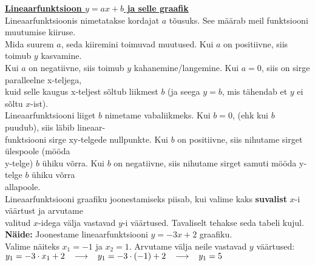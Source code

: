 \begin{center}
{{{\begin{flushleft}
\hspace{5mm}
\textbf{\underline{Lineaarfunktsioon $y=ax+b$ ja selle graafik}}\\
\vspace{5mm}
\hspace{5mm}
Lineaarfunktsioonis nimetatakse kordajat $a$ tõusuks. See määrab meil funktsiooni muutumise kiiruse.\\ \hspace{5mm} Mida suurem $a$, seda kiiremini toimuvad muutused. Kui $a$ on positiivne, siis toimub $y$ kasvamine. \\ \hspace{5mm} Kui $a$ on negatiivne, siis toimub $y$  kahanemine/langemine. Kui $a=0$, siis on sirge paralleelne x-teljega,\\ \hspace{5mm} kuid selle kaugus x-teljest sõltub liikmest $b$ (ja seega $y=b$, mis tähendab et $y$ ei sõltu $x$-ist).\\
\vspace{2mm}
\hspace{5mm}
Lineaarfunktsiooni liiget $b$ nimetame vabaliikmeks. Kui $b=0$, (ehk kui $b$ puudub), siis läbib lineaar-\\ \hspace{5mm} funktsiooni sirge xy-telgede nullpunkte. Kui $b$ on positiivne, siis nihutame sirget ülespoole (mööda\\ \hspace{5mm} y-telge) $b$ ühiku võrra. Kui $b$ on negatiivne, siis nihutame sirget samuti mööda y-telge $b$ ühiku võrra\\ \hspace{5mm} allapoole.\\
\hspace{5mm} Lineaarfunktsiooni graafiku joonestamiseks piisab, kui valime kaks \textbf{suvalist} $x$-i väärtust ja arvutame\\ \hspace{5mm} valitud $x$-idega välja vastavad $y$-i väärtused. Tavaliselt tehakse seda tabeli kujul.\\
\vspace{5mm}
\hspace{5mm}
\textbf{Näide:} Joonestame lineaarfunktsiooni $y=-3x+2$ graafiku.\\
\vspace{5mm}
\hspace{5mm}
Valime näiteks $x_{1}=-1$ ja $x_{2}=1$. Arvutame välja neile vastavad $y$ väärtused:\\
\vspace{2mm}
\hspace{5mm}
$y_{1}=-3\cdot x_{1}+2 \hspace{3mm} \longrightarrow \hspace{3mm} y_{1}=-3\cdot (-1) + 2\hspace{3mm} \longrightarrow \hspace{3mm}  y_{1}=5$


\end{flushleft}}}}
\end{center}
